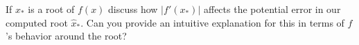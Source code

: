 \documentclass[12pt, leqno]{article}
\begin{document}

If $x_*$ is a root of $f(x)$ discuss how $\lvert f'(x_*) \rvert$
affects the potential error in our computed root $\hat{x}_*.$ Can you
provide an intuitive explanation for this in terms of $f$'s behavior
around the root?
\end{document}
